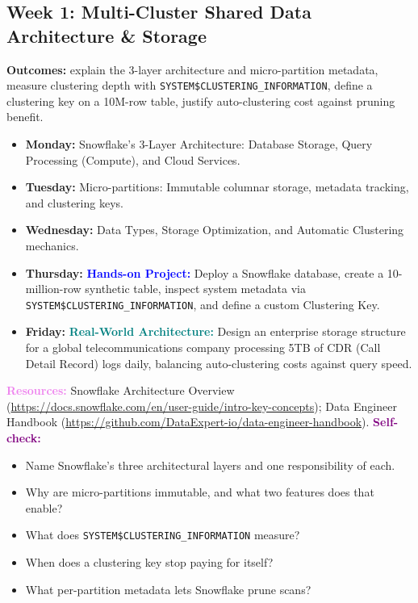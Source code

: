 \documentclass[11pt, a4paper]{article}
\newcommand{\project}[1]{\textbf{\textcolor{blue}{Hands-on Project:}} #1}
\newcommand{\usecase}[1]{\textbf{\textcolor{teal}{Real-World Architecture:}} #1}
\newcommand{\dayitem}[2]{\item \textbf{#1:} #2}
\newcommand{\resources}[1]{\vspace{1mm}\noindent\textbf{\textcolor{violet}{Resources:}} #1}
\newcommand{\selfcheck}[1]{\vspace{1mm}\noindent\textbf{\textcolor{purple}{Self-check:}} #1}
\begin{document}
\subsection*{Week 1: Multi-Cluster Shared Data Architecture \& Storage}
\par\noindent\textbf{Outcomes:} explain the 3-layer architecture and micro-partition metadata, measure clustering depth with \texttt{SYSTEM\$CLUSTERING\_INFORMATION}, define a clustering key on a 10M-row table, justify auto-clustering cost against pruning benefit.
\begin{itemize}[label=-]
    \dayitem{Monday}{Snowflake's 3-Layer Architecture: Database Storage, Query Processing (Compute), and Cloud Services.}
    \dayitem{Tuesday}{Micro-partitions: Immutable columnar storage, metadata tracking, and clustering keys.}
    \dayitem{Wednesday}{Data Types, Storage Optimization, and Automatic Clustering mechanics.}
    \dayitem{Thursday}{\project{Deploy a Snowflake database, create a 10-million-row synthetic table, inspect system metadata via \texttt{SYSTEM\$CLUSTERING\_INFORMATION}, and define a custom Clustering Key.}}
    \dayitem{Friday}{\usecase{Design an enterprise storage structure for a global telecommunications company processing 5TB of CDR (Call Detail Record) logs daily, balancing auto-clustering costs against query speed.}}
\end{itemize}
\resources{Snowflake Architecture Overview (\url{https://docs.snowflake.com/en/user-guide/intro-key-concepts}); Data Engineer Handbook (\url{https://github.com/DataExpert-io/data-engineer-handbook}).}
\selfcheck{\begin{itemize}[label=-, nosep, leftmargin=4mm]
    \item Name Snowflake's three architectural layers and one responsibility of each.
    \item Why are micro-partitions immutable, and what two features does that enable?
    \item What does \texttt{SYSTEM\$CLUSTERING\_INFORMATION} measure?
    \item When does a clustering key stop paying for itself?
    \item What per-partition metadata lets Snowflake prune scans?
\end{itemize}}
\end{document}
